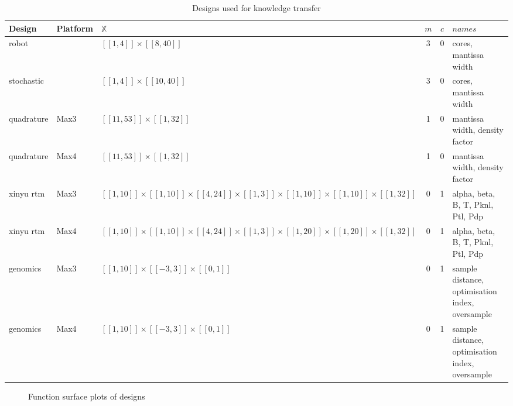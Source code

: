 \documentclass[10pt,a4paper]{article}
\newcommand{\dsb}[1]{[\![#1]\!]}
\begin{document}
\begin{table}[H]
	\begin{tabularx}{\linewidth}{X l Y c c X}
		\hline
		Design & Platform & $\mathbb{X}$ & $m$ & $c$ & $names$\\
		\hline
		robot & & $\dsb{1,4}\times\dsb{8,40}$ & 3 & 0 & cores, mantissa width\\
		stochastic & & $\dsb{1,4}\times\dsb{10,40}$ & 3 & 0 & cores, mantissa width\\
		quadrature\cite{Tse2012} & Max3 & $\dsb{11,53}\times\dsb{1,32}$ & 1 & 0 & mantissa width, density factor\\
		quadrature\cite{Tse2012} & Max4 & $\dsb{11,53}\times\dsb{1,32}$ & 1 & 0 & mantissa width, density factor\\
		xinyu rtm & Max3 & $\dsb{1,10}\times\dsb{1,10}\times\dsb{4,24}\times\dsb{1,3}\times\dsb{1,10}\times\dsb{1,10}\times\dsb{1,32}$ & 0 & 1 & alpha, beta, B, T, Pknl, Ptl, Pdp\\
		xinyu rtm & Max4 & $\dsb{1,10}\times\dsb{1,10}\times\dsb{4,24}\times\dsb{1,3}\times\dsb{1,20}\times\dsb{1,20}\times\dsb{1,32}$ & 0 & 1 & alpha, beta, B, T, Pknl, Ptl, Pdp\\
		genomics\cite{Arram2017} & Max3 & $\dsb{1,10}\times\dsb{-3,3}\times\dsb{0,1}$ & 0 & 1 & sample distance, optimisation index, oversample\\
		genomics\cite{Arram2017} & Max4 & $\dsb{1,10}\times\dsb{-3,3}\times\dsb{0,1}$ & 0 & 1 & sample distance, optimisation index, oversample\\
		\hline
 	\end{tabularx}
	\caption{Designs used for knowledge transfer}
\end{table}

\begin{figure}[H]
	 \begin{center}
	\end{center}
	\caption{Function surface plots of designs}
	\label{fig:subfigures}
\end{figure}
\end{document}
